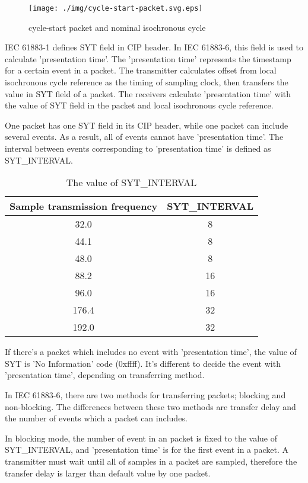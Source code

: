 \documentclass[onecolumn]{article}
\begin{document}
\begin{figure}[htbp]
\centering
\texttt{[image: ./img/cycle-start-packet.svg.eps]}
\caption{{cycle-start packet and nominal isochronous cycle}}
\label{cycle-start}
\end{figure}

IEC 61883-1 defines SYT field in CIP header. In IEC 61883-6, this field is used to calculate 'presentation time'. The 'presentation time' represents the timestamp for a certain event in a packet. The transmitter calculates offset from local isochronous cycle reference as the timing of sampling clock, then transfers the value in SYT field of a packet. The receivers calculate 'presentation time' with the value of SYT field in the packet and local isochronous cycle reference.

One packet has one SYT field in its CIP header, while one packet can include several events. As a result, all of events cannot have 'presentation time'. The interval between events corresponding to 'presentation time' is defined as SYT\_INTERVAL.

\begin{table}[ht]
	\centering
	\caption{{The value of SYT\_INTERVAL}}
	\label{syt_interval}
	\begin{tabular}{cc} \toprule
		Sample transmission frequency & SYT\_INTERVAL \\ \midrule
		32.0	& 8	\\
		44.1	& 8	\\
		48.0	& 8	\\
		88.2	& 16	\\
		96.0	& 16	\\
		176.4	& 32	\\
		192.0	& 32	\\ \bottomrule
	\end{tabular}
\end{table}

If there's a packet which includes no event with 'presentation time', the value of SYT is 'No Information' code (0xffff). It's different to decide the event with 'presentation time', depending on transferring method.

In IEC 61883-6\cite{iec61883-6-1,iec61883-6-2}, there are two methods for transferring packets; blocking and non-blocking. The differences between these two methods are transfer delay and the number of events which a packet can includes.

In blocking mode, the number of event in an packet is fixed to the value of SYT\_INTERVAL, and 'presentation time' is for the first event in a packet. A transmitter must wait until all of samples in a packet are sampled, therefore the transfer delay is larger than default value by one packet.
\end{document}
